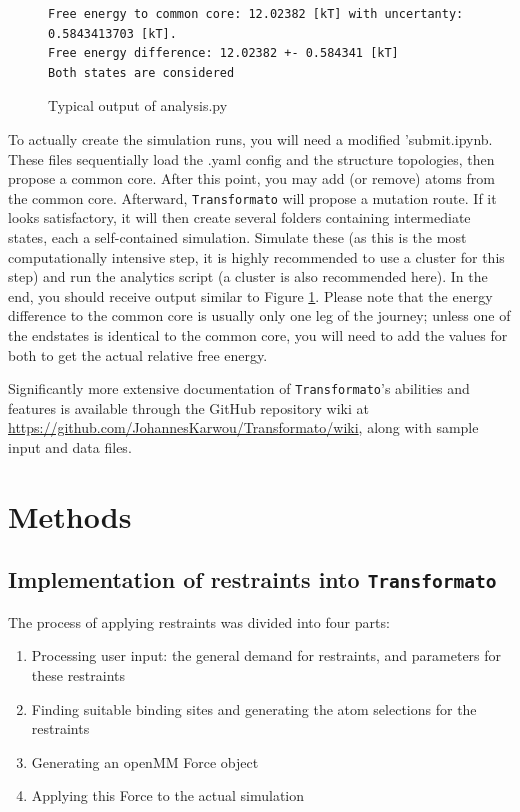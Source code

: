 \documentclass[oneside]{scrreprt}
\begin{document}
\begin{figure}\small

\begin{verbatim}
Free energy to common core: 12.02382 [kT] with uncertanty: 0.5843413703 [kT].
Free energy difference: 12.02382 +- 0.584341 [kT]
Both states are considered
\end{verbatim}
\label{fig:anaoutput}
\caption{Typical output of analysis.py}
\end{figure}

To actually create the simulation runs, you will need a modified 'submit.ipynb. These files sequentially load the .yaml config and the structure topologies, then propose a common core. After this point, you may add (or remove) atoms from the common core. Afterward, \texttt{Transformato} will propose a mutation route. If it looks satisfactory, it will then create several folders containing intermediate states, each a self-contained simulation. Simulate these (as this is the most computationally intensive step, it is highly recommended to use a cluster for this step) and run the analytics script (a cluster is also recommended here). In the end, you should receive output similar to Figure \ref{fig:anaoutput}. Please note that the energy difference to the common core is usually only one leg of the journey; unless one of the endstates is identical to the common core, you will need to add the values for both to get the actual relative free energy. 

Significantly more extensive documentation of \texttt{Transformato}'s abilities and features is available through the GitHub repository wiki at \url{https://github.com/JohannesKarwou/Transformato/wiki}, along with sample input and data files.


\chapter{Methods}
\section{Implementation of restraints into \texttt{Transformato}}

The process of applying restraints was divided into four parts:

\begin{enumerate}
    \item Processing user input: the general demand for restraints, and parameters for these restraints
    \item Finding suitable binding sites and generating the atom selections for the restraints
    \item Generating an openMM Force object
    \item Applying this Force to the actual simulation

\end{enumerate}
\end{document}
